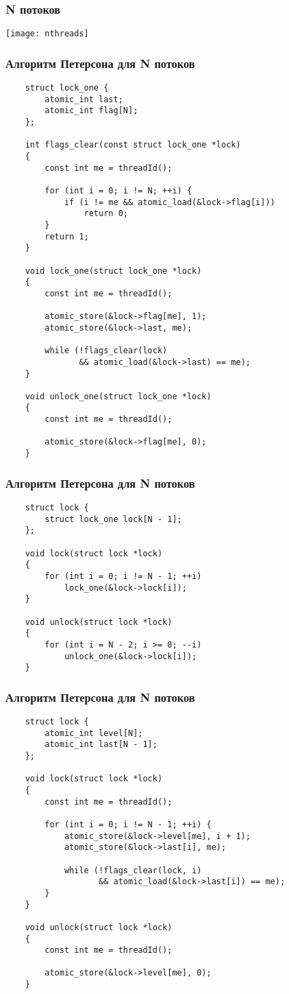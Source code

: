 \begin{frame}
\frametitle{N потоков}
\texttt{[image: nthreads]}
\end{frame}

\begin{frame}[fragile]
\frametitle{Алгоритм Петерсона для N потоков}
\begin{lstlisting}
    struct lock_one {
        atomic_int last;
        atomic_int flag[N];
    };

    int flags_clear(const struct lock_one *lock)
    {
        const int me = threadId();

        for (int i = 0; i != N; ++i) {
            if (i != me && atomic_load(&lock->flag[i]))
                return 0;
        }
        return 1;
    }

    void lock_one(struct lock_one *lock)
    {
        const int me = threadId();

        atomic_store(&lock->flag[me], 1);
        atomic_store(&lock->last, me);

        while (!flags_clear(lock)
               && atomic_load(&lock->last) == me);
    }

    void unlock_one(struct lock_one *lock)
    {
        const int me = threadId();

        atomic_store(&lock->flag[me], 0);
    }
\end{lstlisting}
\end{frame}

\begin{frame}[fragile]
\frametitle{Алгоритм Петерсона для N потоков}
\begin{lstlisting}
    struct lock {
        struct lock_one lock[N - 1];
    };

    void lock(struct lock *lock)
    {
        for (int i = 0; i != N - 1; ++i)
            lock_one(&lock->lock[i]);
    }

    void unlock(struct lock *lock)
    {
        for (int i = N - 2; i >= 0; --i)
            unlock_one(&lock->lock[i]);
    }
\end{lstlisting}
\end{frame}

\begin{frame}[fragile]
\frametitle{Алгоритм Петерсона для N потоков}
\begin{lstlisting}
    struct lock {
        atomic_int level[N];
        atomic_int last[N - 1];
    };

    void lock(struct lock *lock)
    {
        const int me = threadId();

        for (int i = 0; i != N - 1; ++i) {
            atomic_store(&lock->level[me], i + 1);
            atomic_store(&lock->last[i], me);

            while (!flags_clear(lock, i)
                   && atomic_load(&lock->last[i]) == me);
        }
    }

    void unlock(struct lock *lock)
    {
        const int me = threadId();

        atomic_store(&lock->level[me], 0);
    }
\end{lstlisting}
\end{frame}

